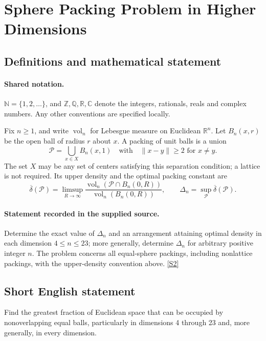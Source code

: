 \documentclass[11pt]{article}
\newcommand{\sref}[2]{\hyperlink{source:#1:#2}{[S#2]}}
\begin{document}
\section{Sphere Packing Problem in Higher Dimensions}\label{statement}

\subsection{Definitions and mathematical statement}

\paragraph{Shared notation.}$\mathbb N=\{1,2,\ldots\}$, and $\mathbb Z,\mathbb Q,\mathbb R,\mathbb C$ denote the integers, rationals, reals and complex numbers. Any other conventions are specified locally.


Fix \(n\ge1\), and write \(\operatorname{vol}_n\) for Lebesgue
measure on Euclidean \(\mathbb R^n\).  Let \(B_n(x,r)\) be the open ball
of radius \(r\) about \(x\).  A packing of unit balls is a union
\[
 \mathcal P=\bigcup_{x\in X}B_n(x,1)
 \quad\text{with}\quad \|x-y\|\ge2\text{ for }x\ne y.
\]
The set \(X\) may be any set of centers satisfying this separation
condition; a lattice is not required.  Its upper density and the
optimal packing constant are
\[
 \overline\delta(\mathcal P)
  =\limsup_{R\to\infty}
    \frac{\operatorname{vol}_n(\mathcal P\cap B_n(0,R))}
         {\operatorname{vol}_n(B_n(0,R))},
 \qquad
 \Delta_n=\sup_{\mathcal P}\overline\delta(\mathcal P).
\]
\paragraph{Statement recorded in the supplied source.}
Determine the exact value of \(\Delta_n\) and an arrangement attaining
optimal density in each dimension \(4\le n\le23\); more generally,
determine \(\Delta_n\) for arbitrary positive integer \(n\).
The problem concerns all equal-sphere packings, including nonlattice
packings, with the upper-density convention above. \sref{statement}{2}
\subsection{Short English statement}
Find the greatest fraction of Euclidean space that can be occupied by nonoverlapping equal balls, particularly in dimensions 4 through 23 and, more generally, in every dimension.
\end{document}
